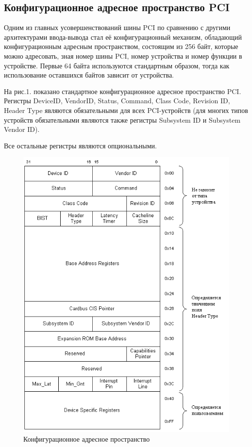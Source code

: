 \subsection{Конфигурационное адресное пространство PCI}

Одним из главных усовершенствований шины PCI по сравнению с другими архитектурами ввода-вывода стал её конфигурационный механизм, обладающий конфигурационным адресным пространством, состоящим из 256 байт, которые можно адресовать, зная номер шины PCI, номер устройства и номер функции в устройстве. Первые 64 байта используются стандартным образом, тогда как использование оставшихся байтов зависит от устройства.

На рис.1. показано стандартное конфигурационное адресное пространство PCI. Регистры DeviceID, VendorID, Status, Command, Class Code, Revision ID, Header Type являются обязательными для всех PCI-устройств (для многих типов устройств обязательными являются также регистры Subsystem ID и Subsystem Vendor ID).

Все остальные регистры являются опциональными.

\begin{figure}[h!]
\centering
\includegraphics[scale=0.88]{res/pic01}
\caption{Конфигурационное адресное пространство}
\end{figure}

